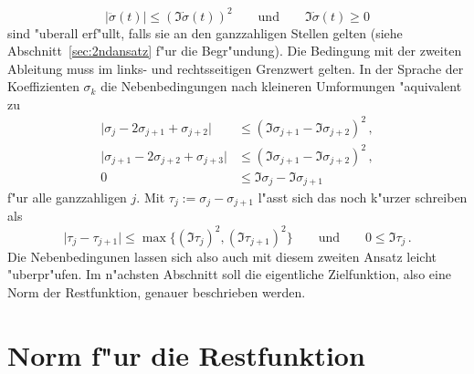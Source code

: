 \documentclass[a4paper]{scrartcl}
\begin{document}
$$ \lvert\ddot\sigma(t)\rvert \le (\Im\dot\sigma(t))^2 
\qquad \text{und} \qquad
\Im\dot\sigma(t)\ge0 $$
sind "uberall erf"ullt, falls sie an den ganzzahligen Stellen gelten (siehe Abschnitt~\ref{sec:2ndansatz} f"ur die Begr"undung). Die Bedingung mit der zweiten Ableitung muss im links- und rechtsseitigen Grenzwert gelten. In der Sprache der Koeffizienten $\sigma_k$ die Nebenbedingungen nach kleineren Umformungen "aquivalent zu 
\begin{align*}
\lvert\sigma_j-2\sigma_{j+1}+\sigma_{j+2}\rvert 
&\le (\Im\sigma_{j+1}-\Im\sigma_{j+2})^2\,, \\
\lvert\sigma_{j+1}-2\sigma_{j+2}+\sigma_{j+3}\rvert 
&\le (\Im\sigma_{j+1}-\Im\sigma_{j+2})^2\,, \\
0&\le \Im\sigma_j-\Im\sigma_{j+1}
\end{align*}
f"ur alle ganzzahligen $j$. Mit 
$ \tau_j := \sigma_j-\sigma_{j+1} $
l"asst sich das noch k"urzer schreiben als
\begin{equation} \label{eq:condTau}
\lvert\tau_j-\tau_{j+1}\rvert \le \max\{(\Im\tau_j)^2, (\Im\tau_{j+1})^2\}
\qquad \text{und} \qquad
0\le\Im\tau_j\,.
\end{equation}
Die Nebenbedingunen lassen sich also auch mit diesem zweiten Ansatz leicht "uberpr"ufen. Im n"achsten Abschnitt soll die eigentliche Zielfunktion, also eine Norm der Restfunktion, genauer beschrieben werden.


\section{Norm f"ur die Restfunktion} \label{sec:norms4r}
\end{document}

